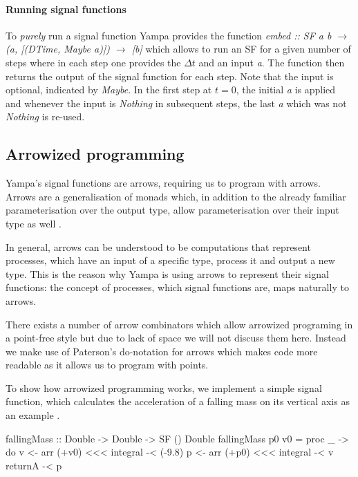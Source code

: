 \paragraph{Running signal functions}
To \textit{purely} run a signal function Yampa provides the function \textit{embed :: SF a b $\rightarrow$ (a, [(DTime, Maybe a)]) $\rightarrow$ [b]} which allows to run an SF for a given number of steps where in each step one provides the $\Delta t$ and an input \textit{a}. The function then returns the output of the signal function for each step. Note that the input is optional, indicated by \textit{Maybe}. In the first step at $t = 0$, the initial \textit{a} is applied and whenever the input is \textit{Nothing} in subsequent steps, the last \textit{a} which was not \textit{Nothing} is re-used.

\subsection{Arrowized programming}
Yampa's signal functions are arrows, requiring us to program with arrows. Arrows are a generalisation of monads which, in addition to the already familiar parameterisation over the output type, allow parameterisation over their input type as well \cite{hughes_generalising_2000, hughes_programming_2005}.

In general, arrows can be understood to be computations that represent processes, which have an input of a specific type, process it and output a new type. This is the reason why Yampa is using arrows to represent their signal functions: the concept of processes, which signal functions are, maps naturally to arrows.

There exists a number of arrow combinators which allow arrowized programing in a point-free style but due to lack of space we will not discuss them here. Instead we make use of Paterson's do-notation for arrows \cite{paterson_new_2001} which makes code more readable as it allows us to program with points.

To show how arrowized programming works, we implement a simple signal function, which calculates the acceleration of a falling mass on its vertical axis as an example \cite{perez_testing_2017}.

\begin{HaskellCode}
fallingMass :: Double -> Double -> SF () Double
fallingMass p0 v0 = proc _ -> do
  v <- arr (+v0) <<< integral -< (-9.8)
  p <- arr (+p0) <<< integral -< v
  returnA -< p
\end{HaskellCode}

